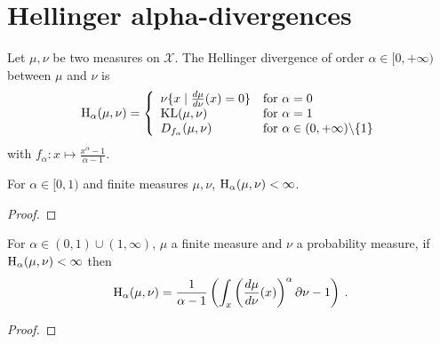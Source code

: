 \section{Hellinger alpha-divergences}

\begin{definition}
  \label{def:hellingerAlpha}
  \leanok
  Let $\mu, \nu$ be two measures on $\mathcal X$. The Hellinger divergence of order $\alpha \in [0,+\infty)$ between $\mu$ and $\nu$ is
  \begin{align*}
  \operatorname{H}_\alpha(\mu, \nu) = \left\{
  \begin{array}{ll}
    \nu \{x \mid \frac{d\mu}{d\nu} (x) = 0\} & \text{for } \alpha = 0 \\
    \operatorname{KL}(\mu, \nu) & \text{for } \alpha = 1
    \\
    D_{f_\alpha}(\mu, \nu) & \text{for } \alpha \in (0,+\infty) \backslash \{1\}
  \end{array}\right.
  \end{align*}
  with $f_\alpha : x \mapsto \frac{x^{\alpha} - 1}{\alpha - 1}$.
\end{definition}

\begin{lemma}
  \label{lem:hellingerAlpha_ne_top_of_lt_one}
  \leanok
  For $\alpha \in [0, 1)$ and finite measures $\mu, \nu$, $\operatorname{H}_\alpha(\mu, \nu) < \infty$.
\end{lemma}

\begin{proof}\leanok
\uses{}
\end{proof}

\begin{lemma}
  \label{lem:hellingerAlpha_eq_integral}
  \leanok
  For $\alpha \in (0,1)\cup(1, \infty)$, $\mu$ a finite measure and $\nu$ a probability measure, if $\operatorname{H}_\alpha(\mu, \nu) < \infty$ then
  \begin{align*}
  \operatorname{H}_\alpha(\mu, \nu) = \frac{1}{\alpha - 1} \left( \int_x \left(\frac{d \mu}{d \nu}(x)\right)^\alpha \partial \nu - 1 \right)
  \: .
  \end{align*}
\end{lemma}

\begin{proof}\leanok
\uses{}
\end{proof}

